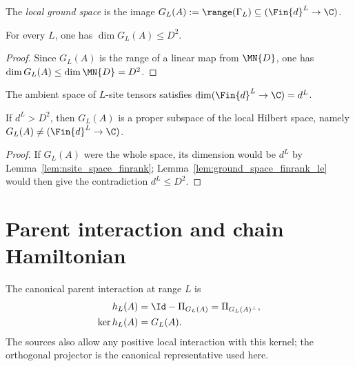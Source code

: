 \begin{definition}\label{def:ground_space_parent}
    \leanok
    The \emph{local ground space} is the image
    $G_L(A):=\range(\Gamma_L)\subseteq(\Fin{d}^{L}\to\C)$.
\end{definition}

\begin{lemma}\label{lem:ground_space_finrank_le}
    \leanok
    For every $L$, one has $\dim G_L(A)\le D^2$.
\end{lemma}

\begin{proof}
    \leanok
    Since $G_L(A)$ is the range of a linear map from $\MN{D}$, one has
    $\dim G_L(A)\le\dim\MN{D}=D^2$.
\end{proof}

\begin{lemma}\label{lem:nsite_space_finrank}
    \leanok
    The ambient space of $L$-site tensors satisfies
    $\dim(\Fin{d}^{L}\to\C)=d^L$.
\end{lemma}

\begin{lemma}\label{lem:ground_space_ne_top}
    \leanok
    If $d^L>D^2$, then $G_L(A)$ is a proper subspace of the local Hilbert
    space, namely $G_L(A)\neq(\Fin{d}^{L}\to\C)$.
\end{lemma}

\begin{proof}
    \leanok
    If $G_L(A)$ were the whole space, its dimension would be $d^L$ by
    Lemma~\ref{lem:nsite_space_finrank}; Lemma~\ref{lem:ground_space_finrank_le}
    would then give the contradiction $d^L\le D^2$.
\end{proof}

\section{Parent interaction and chain Hamiltonian}\label{sec:parent_interaction_defs}

The canonical parent interaction at range $L$ is
\begin{align}
    h_L(A)
     & =\Id-\Pi_{G_L(A)}
    =\Pi_{G_L(A)^\perp},
    \label{eq:parent_interaction} \\
    \ker h_L(A)
     & =G_L(A).
    \notag
\end{align}
The sources also allow any positive local interaction with this kernel; the
orthogonal projector is the canonical representative used here.

